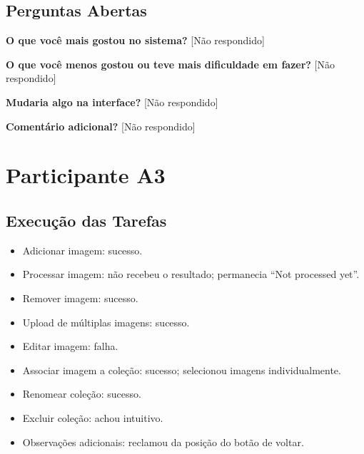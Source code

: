 \subsection*{Perguntas Abertas}
\textbf{O que você mais gostou no sistema?} [Não respondido]

\textbf{O que você menos gostou ou teve mais dificuldade em fazer?} [Não respondido]

\textbf{Mudaria algo na interface?} [Não respondido]

\textbf{Comentário adicional?} [Não respondido]

\newpage
\section*{Participante A3}

\subsection*{Execução das Tarefas}
\begin{itemize}
    \item Adicionar imagem: sucesso.
    \item Processar imagem: não recebeu o resultado; permanecia “Not processed yet”.
    \item Remover imagem: sucesso.
    \item Upload de múltiplas imagens: sucesso.
    \item Editar imagem: falha.
    \item Associar imagem a coleção: sucesso; selecionou imagens individualmente.
    \item Renomear coleção: sucesso.
    \item Excluir coleção: achou intuitivo.
    \item Observações adicionais: reclamou da posição do botão de voltar.
\end{itemize}

\newpage

